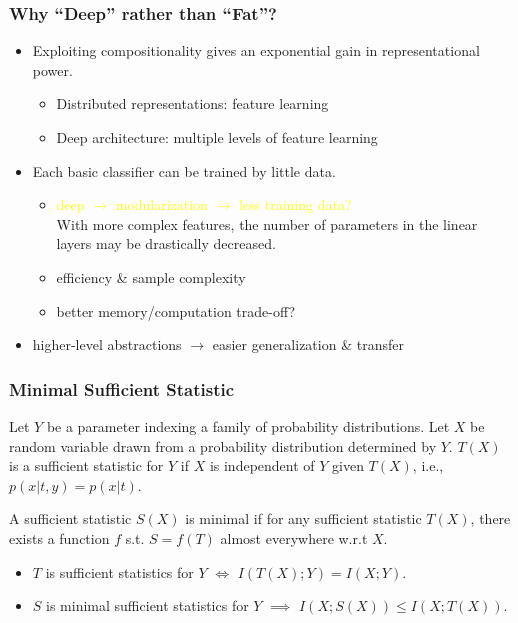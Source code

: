 \documentclass[UTF8,11pt,colorlinks,compress,openany]{beamer}%
\begin{document}
\begin{frame}\frametitle{Why ``Deep'' rather than ``Fat''?}	
	\begin{itemize}
		\item Exploiting compositionality gives an exponential gain in representational power.
		\begin{itemize}
			\item Distributed representations: feature learning
			\item Deep architecture: multiple levels of feature learning
		\end{itemize}
		\item Each basic classifier can be trained by little data.
		\begin{itemize}
			\item \textcolor{yellow}{deep $\to$ modularization $\to$ less training data?}\\
			With more complex features, the number of parameters in the linear layers may be drastically decreased.
			\item efficiency \& sample complexity
			\item better memory/computation trade-off?
		\end{itemize}
		\item higher-level abstractions $\to$ easier generalization \& transfer
	\end{itemize}
\end{frame}

\begin{frame}\frametitle{Minimal Sufficient Statistic}
\begin{definition}
Let $Y$ be a parameter indexing a family of probability distributions. Let $X$ be random variable drawn from a probability distribution determined by $Y$. $T(X)$ is a sufficient statistic for $Y$ if $X$ is independent of $Y$ given $T(X)$, i.e., $p(x|t,y)=p(x|t)$.
\end{definition}
\begin{definition}
A sufficient statistic $S(X)$ is minimal if for any sufficient statistic $T(X)$, there exists a function $f$ s.t. $S=f(T)$ almost everywhere w.r.t $X$.
\end{definition}
\begin{theorem}
\begin{itemize}
\item $T$ is sufficient statistics for $Y$ $\iff$ $I(T(X);Y)=I(X;Y)$.
\item $S$ is minimal sufficient statistics for $Y$ $\implies$ $I(X;S(X))\leq I(X;T(X))$.
\end{itemize}
\end{theorem}
\end{frame}
\end{document}
